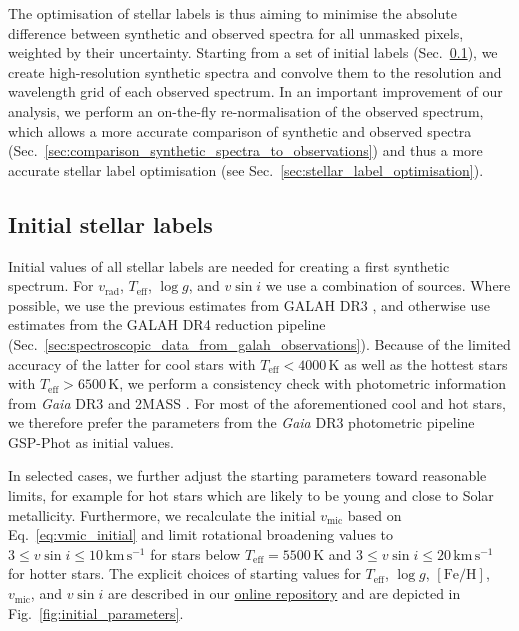 \documentclass[
  journal=pasa,
  manuscript=research-paper, %
  year=2023,
  volume=37
]{cup-journal}
\newcommand{\Teff}{$T_\mathrm{eff}$\xspace}
\newcommand{\logg}{$\log g$\xspace}
\newcommand{\feh}{$\mathrm{[Fe/H]}$\xspace}
\newcommand{\vmic}{$v_\mathrm{mic}$\xspace}
\newcommand{\vsini}{$v \sin i$\xspace}
\newcommand{\vrad}{$v_\mathrm{rad}$\xspace}
\newcommand{\Gaia}{\textit{Gaia}\xspace}
\begin{document}
The optimisation of stellar labels is thus aiming to minimise the absolute difference between synthetic and observed spectra for all unmasked pixels, weighted by their uncertainty. Starting from a set of initial labels (Sec.~\ref{sec:initial_stellar_labels}), we create high-resolution synthetic spectra and convolve them to the resolution and wavelength grid of each observed spectrum. In an important improvement of our analysis, we perform an on-the-fly re-normalisation of the observed spectrum, which allows a more accurate comparison of synthetic and observed spectra (Sec.~\ref{sec:comparison_synthetic_spectra_to_observations}) and thus a more accurate stellar label optimisation (see Sec.~\ref{sec:stellar_label_optimisation}).

\subsection{Initial stellar labels}
\label{sec:initial_stellar_labels}


Initial values of all stellar labels are needed for creating a first synthetic spectrum. For \vrad, \Teff, \logg, and \vsini we use a combination of sources. Where possible, we use the previous estimates from GALAH DR3 \citep{Buder2021}, and otherwise use estimates from the GALAH DR4 reduction pipeline (Sec.~\ref{sec:spectroscopic_data_from_galah_observations}). Because of the limited accuracy of the latter for cool stars with $T_\text{eff} < 4000\,\mathrm{K}$ as well as the hottest stars with $T_\text{eff} > 6500\,\mathrm{K}$, we perform a consistency check with photometric information from \Gaia DR3 \citep{Brown2021} and 2MASS \citep{Skrutskie2006}. For most of the aforementioned cool and hot stars, we therefore prefer the parameters from the \Gaia DR3 photometric pipeline GSP-Phot \citep{Andrae2022,Fouesneau2022} as initial values.

In selected cases, we further adjust the starting parameters toward reasonable limits, for example for hot stars which are likely to be young and close to Solar metallicity. Furthermore, we recalculate the initial \vmic based on Eq.~\ref{eq:vmic_initial} and limit rotational broadening values to $3 \leq v \sin i \leq 10\,\mathrm{km\,s^{-1}}$ for stars below $T_\text{eff} = 5500\,\mathrm{K}$ and $3 \leq v \sin i \leq 20\,\mathrm{km\,s^{-1}}$ for hotter stars. The explicit choices of starting values for \Teff, \logg, \feh, \vmic, and \vsini are described in our \href{https://github.com/svenbuder/GALAH_DR4/blob/main/spectrum_analysis/galah_dr4_initial_parameters.ipynb}{online repository} and are depicted in Fig.~\ref{fig:initial_parameters}.
\end{document}
